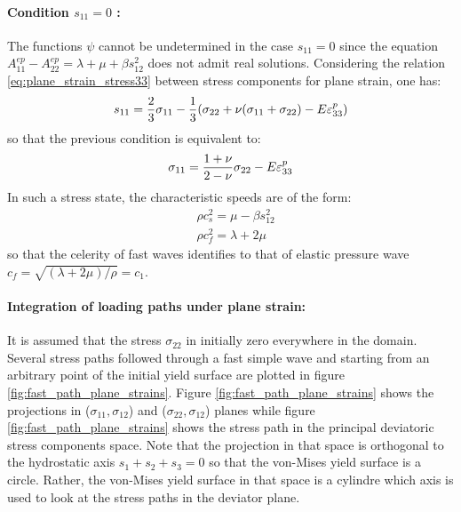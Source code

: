 \paragraph*{Condition $s_{11}=0$ :} The functions $\psi$ cannot be undetermined in the case $s_{11}=0$ since the equation $A_{11}^{ep}-A_{22}^{ep}=\lambda + \mu + \beta s_{12}^2$ does not admit real solutions. Considering the relation \eqref{eq:plane_strain_stress33} between stress components for plane strain, one has:
\begin{equation*}
  s_{11}= \frac{2}{3}\sigma_{11}-\frac{1}{3}(\sigma_{22}+\nu(\sigma_{11}+\sigma_{22})-E\varepsilon^p_{33})
\end{equation*}
so that the previous condition is equivalent to:
\begin{equation}
  \label{eq:plane_strain_s11=0}
  \sigma_{11}=\frac{1+\nu}{2-\nu}\sigma_{22}-E\varepsilon^p_{33}
\end{equation}
In such a stress state, the characteristic speeds are of the form:
\begin{align*}
  & \rho c_s^2 = \mu -\beta s_{12}^2 \\
  & \rho c_f^2 = \lambda +2\mu 
\end{align*}
so that the celerity of fast waves identifies to that of elastic pressure wave $c_f=\sqrt{(\lambda + 2\mu)/\rho}=c_1$.


\paragraph*{Integration of loading paths under plane strain:}
It is assumed that the stress $\sigma_{22}$ in initially zero everywhere in the domain. Several stress paths followed through a fast simple wave and starting from an arbitrary point of the initial yield surface are plotted in figure \ref{fig:fast_path_plane_strains}. Figure \ref{fig:fast_path_plane_strains} shows the projections in ($\sigma_{11},\sigma_{12}$) and ($\sigma_{22},\sigma_{12}$) planes while figure \ref{fig:fast_path_plane_strains} shows the stress path in the principal deviatoric stress components space. Note that the projection in that space is orthogonal to the hydrostatic axis $s_1+s_2+s_3=0$ so that the von-Mises yield surface is a circle. Rather, the von-Mises yield surface in that space is a cylindre which axis is used to look at the stress paths in the deviator plane.

